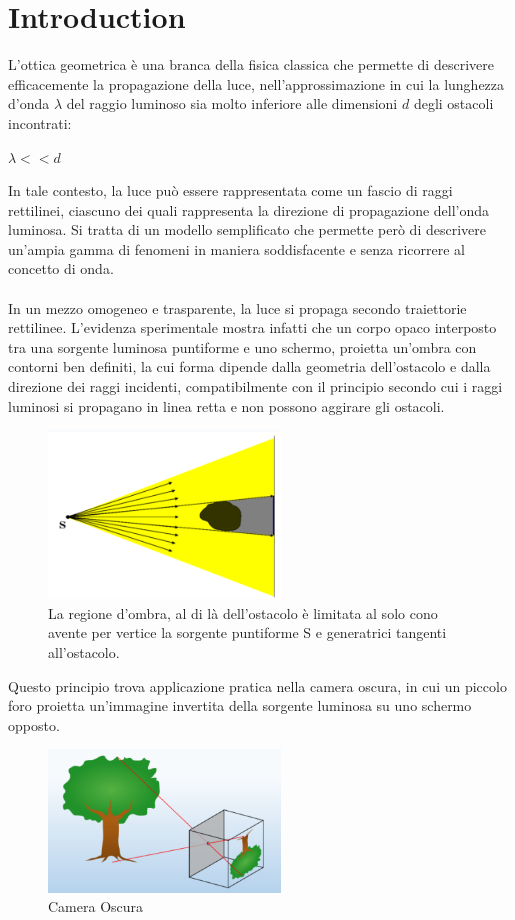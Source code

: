 \section{Introduction}
L'ottica geometrica è una branca della fisica classica che permette di descrivere 
efficacemente la propagazione della luce, nell'approssimazione in cui la lunghezza d'onda $\lambda$ del raggio luminoso 
sia molto inferiore alle dimensioni $d$ degli ostacoli incontrati: 
\begin{center}
    $\lambda << d$
\end{center}
In tale contesto, la luce può essere rappresentata come un fascio di raggi rettilinei, 
ciascuno dei quali rappresenta la direzione di propagazione dell'onda luminosa. Si tratta di un modello semplificato che 
permette però di descrivere un'ampia gamma di fenomeni in maniera soddisfacente e senza ricorrere al concetto di onda. 
\paragraph{}
In un mezzo omogeneo e trasparente, la luce si propaga secondo traiettorie rettilinee. 
L'evidenza sperimentale mostra infatti che  un corpo opaco interposto tra una sorgente luminosa puntiforme e uno schermo, 
proietta un'ombra con contorni ben definiti, la cui forma dipende dalla geometria dell'ostacolo e dalla direzione dei raggi incidenti, 
compatibilmente con il principio secondo cui i raggi luminosi si propagano in linea retta e non possono aggirare gli ostacoli.
\begin{figure}[H]
  \centering
  \includegraphics[width=0.55\textwidth]{../figures/pendolo.png}
  \caption{La regione d’ombra, al di là
dell’ostacolo è limitata al solo
cono avente per vertice la sorgente
puntiforme S e generatrici tangenti
all’ostacolo.}
\end{figure}

Questo principio trova applicazione pratica nella camera oscura, in cui un piccolo foro proietta un'immagine invertita della sorgente 
luminosa su uno schermo opposto.
\begin{figure}[H]
  \centering
  \includegraphics[width=0.55\textwidth]{../figures/camera_oscura.png}
  \caption{Camera Oscura}
\end{figure}

